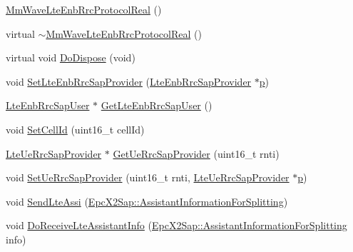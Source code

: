 \begin{DoxyCompactItemize}
\item 
\hyperlink{classns3_1_1MmWaveLteEnbRrcProtocolReal_a76273790cde35d2369ceac4c64fced24}{Mm\+Wave\+Lte\+Enb\+Rrc\+Protocol\+Real} ()
\item 
virtual \hyperlink{classns3_1_1MmWaveLteEnbRrcProtocolReal_adef0791f4877de20ccae236f6491eee5}{$\sim$\+Mm\+Wave\+Lte\+Enb\+Rrc\+Protocol\+Real} ()
\item 
virtual void \hyperlink{classns3_1_1MmWaveLteEnbRrcProtocolReal_ae65d16cd2a56d85202a09ee547bb6cbe}{Do\+Dispose} (void)
\item 
void \hyperlink{classns3_1_1MmWaveLteEnbRrcProtocolReal_a5f39bdd277925f256e157f5d51afe3bf}{Set\+Lte\+Enb\+Rrc\+Sap\+Provider} (\hyperlink{classns3_1_1LteEnbRrcSapProvider}{Lte\+Enb\+Rrc\+Sap\+Provider} $\ast$\hyperlink{lte__link__budget__x2__handover__measures_8m_ac9de518908a968428863f829398a4e62}{p})
\item 
\hyperlink{classns3_1_1LteEnbRrcSapUser}{Lte\+Enb\+Rrc\+Sap\+User} $\ast$ \hyperlink{classns3_1_1MmWaveLteEnbRrcProtocolReal_af8a240437e560ce8af48cd1507afc8a1}{Get\+Lte\+Enb\+Rrc\+Sap\+User} ()
\item 
void \hyperlink{classns3_1_1MmWaveLteEnbRrcProtocolReal_a7da81ef357d97150a2fc77265f78f814}{Set\+Cell\+Id} (uint16\+\_\+t cell\+Id)
\item 
\hyperlink{classns3_1_1LteUeRrcSapProvider}{Lte\+Ue\+Rrc\+Sap\+Provider} $\ast$ \hyperlink{classns3_1_1MmWaveLteEnbRrcProtocolReal_a2fc3cd8ece662422d97515658c0297e5}{Get\+Ue\+Rrc\+Sap\+Provider} (uint16\+\_\+t rnti)
\item 
void \hyperlink{classns3_1_1MmWaveLteEnbRrcProtocolReal_ae1463936227fd98d5c39fcb2f56562f2}{Set\+Ue\+Rrc\+Sap\+Provider} (uint16\+\_\+t rnti, \hyperlink{classns3_1_1LteUeRrcSapProvider}{Lte\+Ue\+Rrc\+Sap\+Provider} $\ast$\hyperlink{lte__link__budget__x2__handover__measures_8m_ac9de518908a968428863f829398a4e62}{p})
\item 
void \hyperlink{classns3_1_1MmWaveLteEnbRrcProtocolReal_a7cc74a16f04777a8d085f00418f70e50}{Send\+Lte\+Assi} (\hyperlink{structns3_1_1EpcX2Sap_1_1AssistantInformationForSplitting}{Epc\+X2\+Sap\+::\+Assistant\+Information\+For\+Splitting})
\item 
void \hyperlink{classns3_1_1MmWaveLteEnbRrcProtocolReal_a46b7eb4633b0d76e28c1277520efc5a9}{Do\+Receive\+Lte\+Assistant\+Info} (\hyperlink{structns3_1_1EpcX2Sap_1_1AssistantInformationForSplitting}{Epc\+X2\+Sap\+::\+Assistant\+Information\+For\+Splitting} info)
\end{DoxyCompactItemize}

